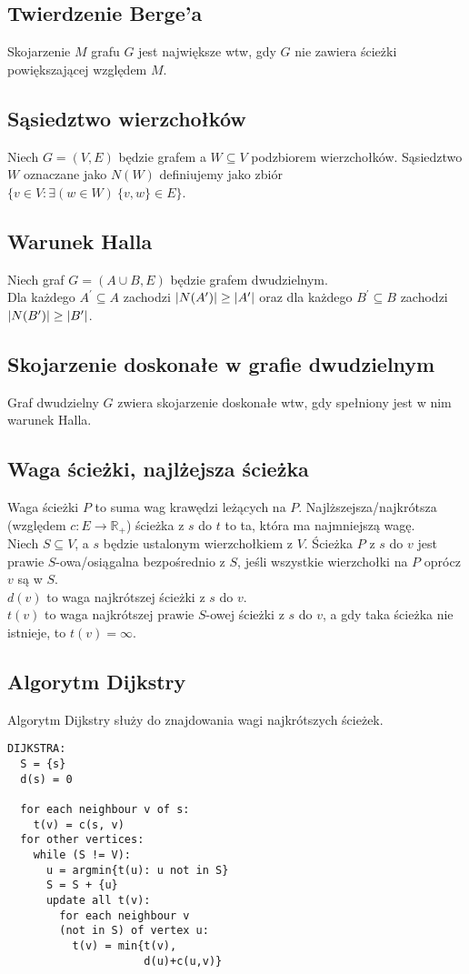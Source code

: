 \subsection*{Twierdzenie Berge'a}
Skojarzenie $M$ grafu $G$ jest największe wtw, gdy $G$ nie zawiera ścieżki
powiększającej względem $M$.

\subsection*{Sąsiedztwo wierzchołków}
Niech $G = (V, E)$ będzie grafem a $W \subseteq V$ podzbiorem wierzchołków.
Sąsiedztwo $W$ oznaczane jako $N(W)$ definiujemy jako zbiór \\
$\{ v \in V : \exists(w \in W) \ \{ v, w\} \in E \}$.

\subsection*{Warunek Halla}
Niech graf $G = (A \cup B, E)$ będzie grafem dwudzielnym. \\
Dla każdego $A^\prime \subseteq A$ zachodzi 
$\left| N(A^\prime) \right| \geq \left| A^\prime \right|$ oraz dla każdego $B^\prime \subseteq B$ 
zachodzi $\left| N(B^\prime) \right| \geq \left| B^\prime \right|$.

\subsection*{Skojarzenie doskonałe w grafie dwudzielnym}
Graf dwudzielny $G$ zwiera skojarzenie doskonałe wtw, gdy spełniony jest 
w nim warunek Halla. 

\subsection*{Waga ścieżki, najlżejsza ścieżka}
Waga ścieżki $P$ to suma wag krawędzi leżących na $P$. Najlższejsza/najkrótsza
(względem $c : E \to \mathbb{R}_+$) ścieżka z $s$ do $t$ to ta, która ma 
najmniejszą wagę. \\
Niech $S \subseteq V$, a $s$ będzie ustalonym wierzchołkiem z $V$. Ścieżka $P$
z $s$ do $v$ jest prawie $S$-owa/osiągalna bezpośrednio z $S$, jeśli wszystkie
wierzchołki na $P$ oprócz $v$ są w $S$. \\
$d(v)$ to waga najkrótszej ścieżki z $s$ do $v$. \\
$t(v)$ to waga najkrótszej prawie $S$-owej ścieżki z $s$ do $v$, a gdy taka
ścieżka nie istnieje, to $t(v) = \infty$.

\subsection*{Algorytm Dijkstry}
Algorytm Dijkstry służy do znajdowania wagi najkrótszych ścieżek.
\begin{lstlisting}[style=code]
DIJKSTRA:
  S = {s}
  d(s) = 0

  for each neighbour v of s:
    t(v) = c(s, v)
  for other vertices:
    while (S != V):
      u = argmin{t(u): u not in S}
      S = S + {u}
      update all t(v):
        for each neighbour v 
        (not in S) of vertex u:
          t(v) = min{t(v),
                     d(u)+c(u,v)}
\end{lstlisting}

